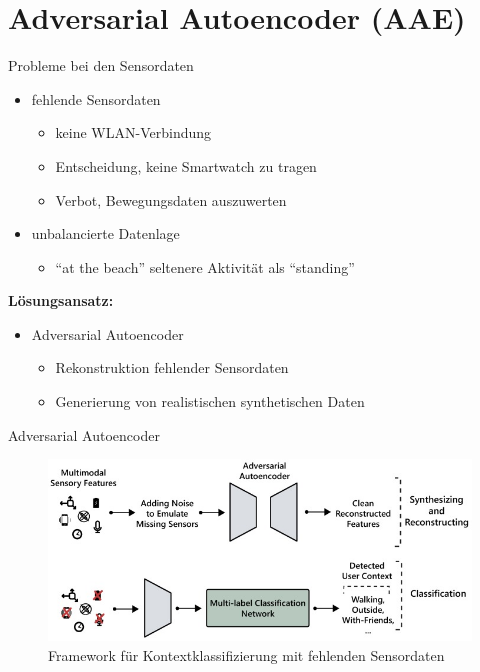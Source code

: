 \documentclass[10pt,%
	wide,%
	xcolor={x11names},%
	hyperref={colorlinks},%
	pantone312,%
	handout,%
	]{beamer}
\begin{document}
\section{Adversarial Autoencoder (AAE)}

\begin{frame}[t]{Probleme bei den Sensordaten}
	\begin{itemize}
		\item fehlende Sensordaten
		\begin{itemize}
			\item keine WLAN-Verbindung
			\item Entscheidung, keine Smartwatch zu tragen
			\item Verbot, Bewegungsdaten auszuwerten
		\end{itemize}
		\item unbalancierte Datenlage
		\begin{itemize}
			\item \enquote{at the beach} seltenere Aktivität als \enquote{standing}
		\end{itemize}
	\end{itemize}

\textbf{Lösungsansatz:}
\begin{itemize}
	\item Adversarial Autoencoder \cite{sol18}
	\begin{itemize}
		\item Rekonstruktion fehlender Sensordaten
		\item Generierung von realistischen synthetischen Daten
	\end{itemize}
\end{itemize}
\end{frame}

\begin{frame}[t]{Adversarial Autoencoder}
	\begin{figure}
		\centering
		\includegraphics[scale=4.0]{img/aae}
		\caption{Framework für Kontextklassifizierung mit fehlenden Sensordaten \cite{sol18}}
	\end{figure}
\end{frame}
\end{document}
